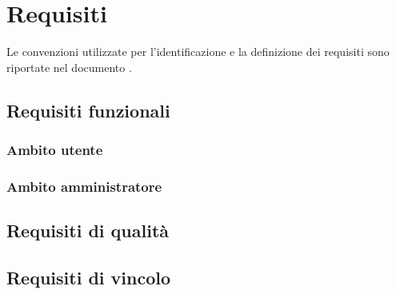 \section{Requisiti}
Le convenzioni utilizzate per l'identificazione e la definizione dei requisiti sono riportate nel documento \NormeDiProgetto{}. 
\subsection{Requisiti funzionali}
\subsubsection{Ambito utente}
\subsubsection{Ambito amministratore}
\subsection{Requisiti di qualità}
\subsection{Requisiti di vincolo}